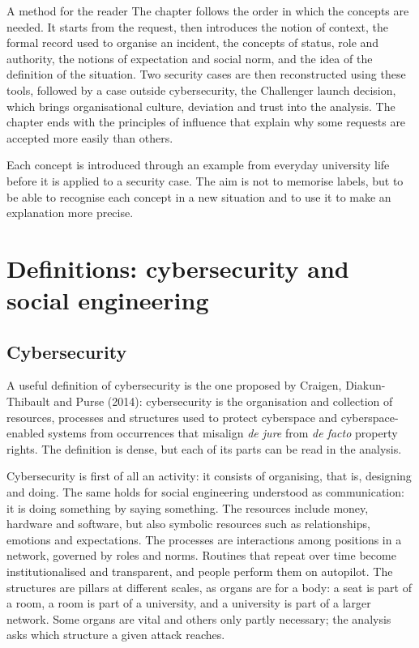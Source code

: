 \begin{nota}{A method for the reader}
	The chapter follows the order in which the concepts are needed. It starts from the request, then introduces the notion of context, the formal record used to organise an incident, the concepts of status, role and authority, the notions of expectation and social norm, and the idea of the definition of the situation. Two security cases are then reconstructed using these tools, followed by a case outside cybersecurity, the Challenger launch decision, which brings organisational culture, deviation and trust into the analysis. The chapter ends with the principles of influence that explain why some requests are accepted more easily than others.
	
	Each concept is introduced through an example from everyday university life before it is applied to a security case. The aim is not to memorise labels, but to be able to recognise each concept in a new situation and to use it to make an explanation more precise.
\end{nota}


\section{Definitions: cybersecurity and social engineering}

\subsection{Cybersecurity}
A useful definition of cybersecurity is the one proposed by Craigen, Diakun-Thibault and Purse (2014): cybersecurity is the organisation and collection of resources, processes and structures used to protect cyberspace and cyberspace-enabled systems from occurrences that misalign \emph{de jure} from \emph{de facto} property rights. The definition is dense, but each of its parts can be read in the analysis.

Cybersecurity is first of all an activity: it consists of organising, that is, designing and doing. The same holds for social engineering understood as communication: it is doing something by saying something. The resources include money, hardware and software, but also symbolic resources such as relationships, emotions and expectations. The processes are interactions among positions in a network, governed by roles and norms. Routines that repeat over time become institutionalised and transparent, and people perform them on autopilot. The structures are pillars at different scales, as organs are for a body: a seat is part of a room, a room is part of a university, and a university is part of a larger network. Some organs are vital and others only partly necessary; the analysis asks which structure a given attack reaches.

